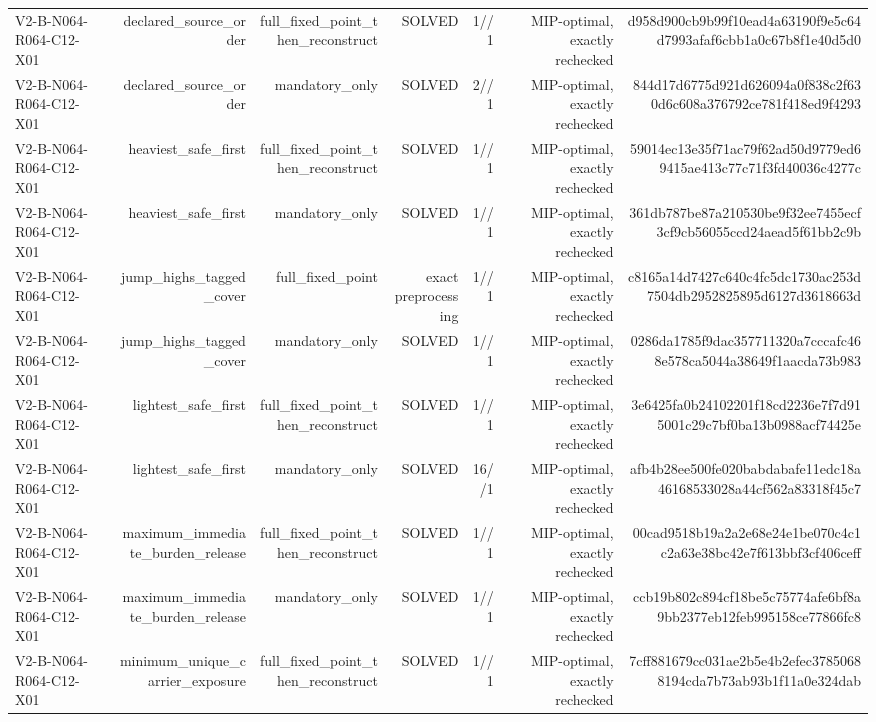 {\begin{longtable}{lrrrrrr}
V2-B-N064-R064-C12-X01 & declared\_source\_order & full\_fixed\_point\_then\_reconstruct & SOLVED & 1//1 & MIP-optimal, exactly rechecked & d958d900cb9b99f10ead4a63190f9e5c64d7993afaf6cbb1a0c67b8f1e40d5d0 \\
V2-B-N064-R064-C12-X01 & declared\_source\_order & mandatory\_only & SOLVED & 2//1 & MIP-optimal, exactly rechecked & 844d17d6775d921d626094a0f838c2f630d6c608a376792ce781f418ed9f4293 \\
V2-B-N064-R064-C12-X01 & heaviest\_safe\_first & full\_fixed\_point\_then\_reconstruct & SOLVED & 1//1 & MIP-optimal, exactly rechecked & 59014ec13e35f71ac79f62ad50d9779ed69415ae413c77c71f3fd40036c4277c \\
V2-B-N064-R064-C12-X01 & heaviest\_safe\_first & mandatory\_only & SOLVED & 1//1 & MIP-optimal, exactly rechecked & 361db787be87a210530be9f32ee7455ecf3cf9cb56055ccd24aead5f61bb2c9b \\
V2-B-N064-R064-C12-X01 & jump\_highs\_tagged\_cover & full\_fixed\_point & exact preprocessing & 1//1 & MIP-optimal, exactly rechecked & c8165a14d7427c640c4fc5dc1730ac253d7504db2952825895d6127d3618663d \\
V2-B-N064-R064-C12-X01 & jump\_highs\_tagged\_cover & mandatory\_only & SOLVED & 1//1 & MIP-optimal, exactly rechecked & 0286da1785f9dac357711320a7cccafc468e578ca5044a38649f1aacda73b983 \\
V2-B-N064-R064-C12-X01 & lightest\_safe\_first & full\_fixed\_point\_then\_reconstruct & SOLVED & 1//1 & MIP-optimal, exactly rechecked & 3e6425fa0b24102201f18cd2236e7f7d915001c29c7bf0ba13b0988acf74425e \\
V2-B-N064-R064-C12-X01 & lightest\_safe\_first & mandatory\_only & SOLVED & 16//1 & MIP-optimal, exactly rechecked & afb4b28ee500fe020babdabafe11edc18a46168533028a44cf562a83318f45c7 \\
V2-B-N064-R064-C12-X01 & maximum\_immediate\_burden\_release & full\_fixed\_point\_then\_reconstruct & SOLVED & 1//1 & MIP-optimal, exactly rechecked & 00cad9518b19a2a2e68e24e1be070c4c1c2a63e38bc42e7f613bbf3cf406ceff \\
V2-B-N064-R064-C12-X01 & maximum\_immediate\_burden\_release & mandatory\_only & SOLVED & 1//1 & MIP-optimal, exactly rechecked & ccb19b802c894cf18be5c75774afe6bf8a9bb2377eb12feb995158ce77866fc8 \\
V2-B-N064-R064-C12-X01 & minimum\_unique\_carrier\_exposure & full\_fixed\_point\_then\_reconstruct & SOLVED & 1//1 & MIP-optimal, exactly rechecked & 7cff881679cc031ae2b5e4b2efec37850688194cda7b73ab93b1f11a0e324dab \\

\end{longtable}}
